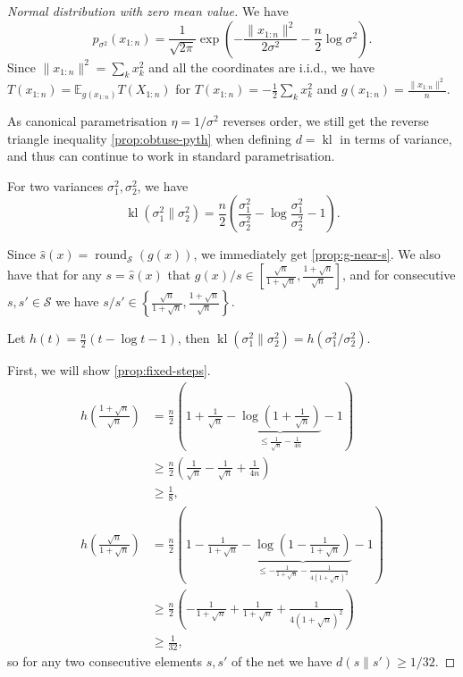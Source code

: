\documentclass{article}
\theoremstyle{definition}
\theoremstyle{definition}
\newcommand{\expectE}{\mathbb{E}}
\newcommand{\kl}{\operatorname{kl}}
\begin{document}
\begin{proof}[Normal distribution with zero mean value]
	We have
	\[
		p_{\sigma^2}(x_{1:n})=\frac{1}{\sqrt{2\pi}}\exp\left(-\frac{\|x_{1:n}\|^2}{2\sigma^2}-\frac{n}{2}\log \sigma^2\right).
	\]
	Since $\|x_{1:n}\|^2 = \sum_k x_k^2$ and all the coordinates are i.i.d., we have $T(x_{1:n})=\expectE_{g(x_{1:n})}T(X_{1:n})$ for $T(x_{1:n}) = -\frac{1}{2}\sum_k x_k^2$ and $g(x_{1:n})= \frac{\|x_{1:n}\|^2}{n}$. 
	                                                                                                                                                                                                                   
	As canonical parametrisation $\eta = 1/\sigma^2$ reverses order, we still get the reverse triangle inequality \ref{prop:obtuse-pyth} when defining $d = \kl$ in terms of variance, and thus can continue to work in standard parametrisation.
	
	For two variances $\sigma^2_1, \sigma^2_2$, we have
	\[
		\kl(\sigma^2_1 \| \sigma^2_2) = \frac{n}{2} \left( \frac{\sigma^2_1}{\sigma^2_2}-\log \frac{\sigma^2_1}{\sigma^2_2} -1 \right).
	\]
	
	Since $\hat{s}(x) = \operatorname{round}_\mathcal{S}(g(x))$, we immediately get \ref{prop:g-near-s}. We also have that for any $s=\hat{s}(x)$ that $g(x)/s \in \left[\frac{\sqrt{n}}{1+\sqrt{n}}, \frac{1+\sqrt{n}}{\sqrt{n}}\right]$,  and for consecutive $s, s' \in \mathcal{S}$ we have $s/s' \in \left\{\frac{\sqrt{n}}{1+\sqrt{n}}, \frac{1+\sqrt{n}}{\sqrt{n}} \right\}$.
	
	Let $h(t)  = \frac{n}{2} \left(t - \log t - 1\right)$, then $\kl(\sigma^2_1 \| \sigma^2_2) = h\left(\sigma^2_1 / \sigma^2_2\right)$.
	
	First, we will show \ref{prop:fixed-steps}. 
	\begin{align*}
		h\left(\frac{1 + \sqrt{n}}{\sqrt{n}}\right) &= \frac{n}{2}\left(1 + \frac{1}{\sqrt{n}} - \underbrace{\log \left(1 + \frac{1}{\sqrt{n}} \right)}_{\le \frac{1}{\sqrt{n}} - \frac{1}{4n}} - 1\right)\\
		&\ge \frac{n}{2} \left(\frac{1}{\sqrt{n}} - \frac{1}{\sqrt{n}} + \frac{1}{4n} \right)\\
		&\ge \frac{1}{8},\\
		h\left(\frac{\sqrt{n}}{1+\sqrt{n}}\right) &= \frac{n}{2}\left(1 - \frac{1}{1+\sqrt{n}} - \underbrace{\log \left(1 - \frac{1}{1+\sqrt{n}} \right)}_{\le -\frac{1}{1+\sqrt{n}} - \frac{1}{4\left(1+\sqrt{n}\right)^2}} - 1\right)\\
		&\ge \frac{n}{2} \left(-\frac{1}{1+\sqrt{n}} + \frac{1}{1 + \sqrt{n}} + \frac{1}{4\left(1 + \sqrt{n}\right)^2}\right)\\
		&\ge \frac{1}{32},
	\end{align*}
	so for any two consecutive elements $s, s'$ of the net we have $d(s \| s') \ge 1/32$.
	

\end{proof}
\end{document}
